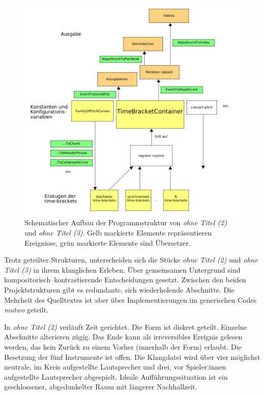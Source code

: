\documentclass[12pt,a4paper,ngerman]{article}
\begin{document}
\begin{figure}[h!]
    \begin{center}
        \includegraphics[scale=0.42]{pictures/ohne-titel-mutwo-structure.png}
    \end{center}
    \caption{%
        Schematischer Aufbau der Programmstruktur von \emph{ohne Titel (2)} und  \emph{ohne Titel (3)}.
        Gelb markierte Elemente repräsentieren Ereignisse, grün markierte Elemente sind Übersetzer.
    }
    \label{fig:ohneTitelMutwoStructure}
\end{figure}


Trotz geteilter Strukturen, unterscheiden sich die Stücke \emph{ohne Titel (2)} und  \emph{ohne Titel (3)} in ihrem klanglichen Erleben.
Über gemeinsamen Untergrund sind kompositorisch--kontrastierende Entscheidungen gesetzt.
Zwischen den beiden Projektstrukturen gibt es redundante, sich wiederholende Abschnitte.
Die Mehrheit des Quelltextes ist aber über Implementierungen im generischen Codes \emph{mutwo} geteilt.

\smallskip

In \emph{ohne Titel (2)} verläuft Zeit gerichtet.
Die Form ist diskret geteilt.
Einzelne Abschnitte alterieren zügig.
Das Ende kann als irreversibles Ereignis gelesen werden, das kein Zurück zu einem Vorher (innerhalb der Form) erlaubt.
Die Besetzung der fünf Instrumente ist offen.
Die Klangdatei wird über vier möglichst neutrale, im Kreis aufgestellte Lautsprecher und drei, vor Spieler:innen aufgestellte Lautsprecher abgespielt.
Ideale Aufführungssituation ist ein geschlossener, abgedunkelter Raum mit längerer Nachhallzeit.
\end{document}
